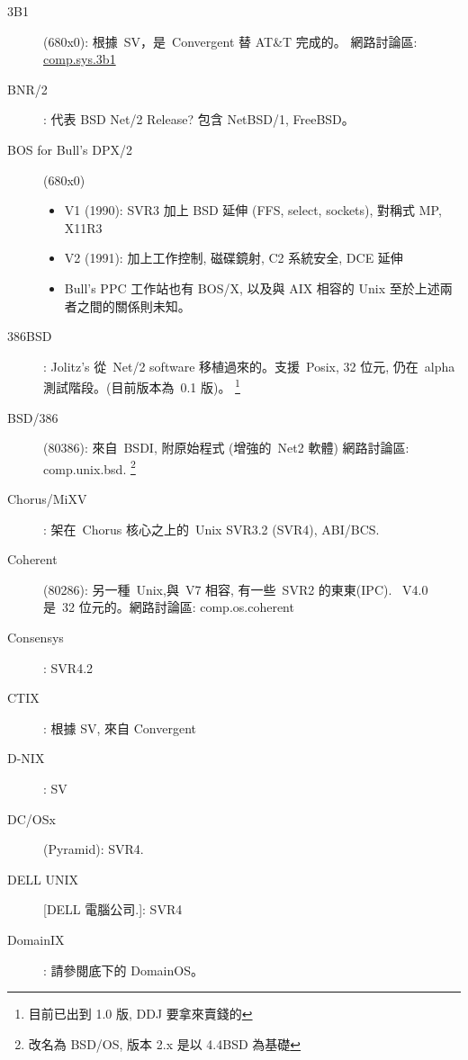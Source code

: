 \documentclass{article}
\begin{document}
\begin{CJK*}{Bg5}{ming}
\begin{description}
      
      \item [3B1] (680x0): 根據~SV，是~Convergent 替 AT\&T 完成的。
         網路討論區: \url{comp.sys.3b1}

      \item [BNR/2]: 代表 BSD Net/2 Release? 包含 NetBSD/1, FreeBSD。

      \item [BOS for Bull's DPX/2] (680x0)
	\begin{itemize}
         \item V1 (1990): SVR3 加上 BSD 延伸 (FFS, select, sockets),
           對稱式 MP, X11R3
         \item  V2 (1991): 加上工作控制, 磁碟鏡射, C2 系統安全,
           DCE 延伸
         \item  Bull's PPC 工作站也有 BOS/X, 以及與 AIX 相容的 Unix
           至於上述兩者之間的關係則未知。
	\end{itemize}

      \item [386BSD]: Jolitz's 從~Net/2 software 移植過來的。支援~Posix, 32 位元,
           仍在~alpha 測試階段。(目前版本為~0.1 版)。
           \footnote{目前已出到 1.0 版, DDJ 要拿來賣錢的}

      \item [BSD/386] (80386): 來自~BSDI, 附原始程式 (增強的~Net2 軟體)
         網路討論區: comp.unix.bsd.
        \footnote{改名為 BSD/OS, 版本 2.x 是以 4.4BSD 為基礎}

      \item [Chorus/MiXV]: 架在~Chorus 核心之上的~Unix SVR3.2 (SVR4), 
	ABI/BCS.

      \item [Coherent] (80286): 
	另一種~Unix,與~V7 相容, 有一些~SVR2 的東東(IPC).
        ~V4.0 是~32 位元的。網路討論區: comp.os.coherent

      \item [Consensys]: SVR4.2

      \item [CTIX]: 根據 SV, 來自 Convergent

      \item [D-NIX]:  SV

      \item [DC/OSx] (Pyramid):  SVR4.

      \item [DELL UNIX] [DELL 電腦公司.]: SVR4

      \item [DomainIX]: 請參閱底下的 DomainOS。


\end{description}
\end{CJK*}
\end{document}
